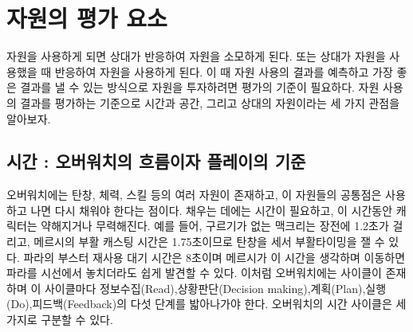 \chapter{자원의 평가 요소}
자원을 사용하게 되면 상대가 반응하여 자원을 소모하게 된다. 또는 상대가 자원을 사용했을 때 반응하여 자원을 사용하게 된다. 이 때 자원 사용의 결과를 예측하고 가장 좋은 결과를 낼 수 있는 방식으로 자원을 투자하려면 평가의 기준이 필요하다. 자원 사용의 결과를 평가하는 기준으로 시간과 공간, 그리고 상대의 자원이라는 세 가지 관점을 알아보자.
\section{시간 : 오버워치의 흐름이자 플레이의 기준}
오버워치에는 탄창, 체력, 스킬 등의 여러 자원이 존재하고, 이 자원들의 공통점은 사용하고 나면 다시 채워야 한다는 점이다. 채우는 데에는 시간이 필요하고, 이 시간동안 캐릭터는 약해지거나 무력해진다. 예를 들어, 구르기가 없는 맥크리는 장전에 1.2초가 걸리고, 메르시의 부활 캐스팅 시간은 1.75초이므로 탄창을 세서 부활타이밍을 잴 수 있다.
파라의 부스터 재사용 대기 시간은 8초이며 메르시가 이 시간을 생각하며 이동하면 파라를 시선에서 놓치더라도 쉽게 발견할 수 있다. 이처럼 오버워치에는 사이클이 존재하며 이 사이클마다 정보수집(Read),상황판단(Decision making),계획(Plan),실행(Do),피드백(Feedback)의 다섯 단계를 밟아나가야 한다.
오버워치의 시간 사이클은 세 가지로 구분할 수 있다.
